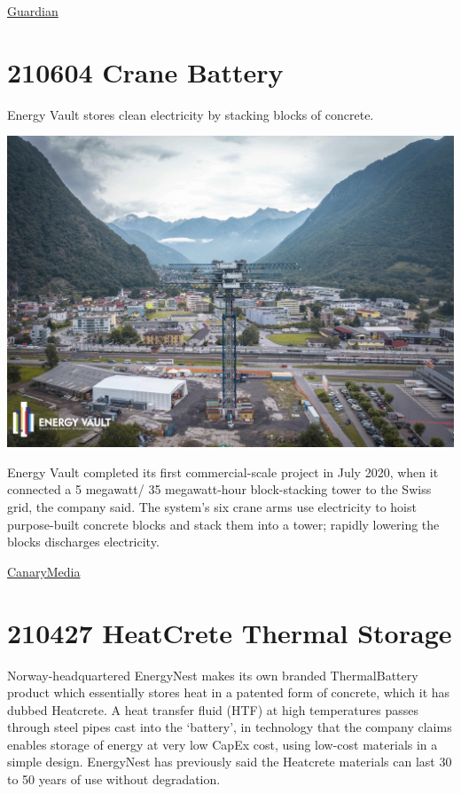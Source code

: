 \documentclass[
]{book}
\begin{document}
\href{https://www.theguardian.com/business/2021/jun/29/equinor-to-triple-uk-hydrogen-output-with-new-plant-near-hull}{Guardian}

\hypertarget{crane-battery}{%
\section{210604 Crane Battery}\label{crane-battery}}

Energy Vault stores clean electricity by stacking blocks of concrete.

\includegraphics{fig/crane_battery.png}

Energy Vault completed its first commercial-scale project in July 2020, when it connected a 5 megawatt/ 35 megawatt-hour block-stacking tower to the Swiss grid, the company said. The system's six crane arms use electricity to hoist purpose-built concrete blocks and stack them into a tower; rapidly lowering the blocks discharges electricity.

\href{https://www.canarymedia.com/articles/energy-vault-nabs-investment-from-saudi-aramco-for-block-stacking-storage/}{CanaryMedia}

\hypertarget{heatcrete-thermal-storage}{%
\section{210427 HeatCrete Thermal Storage}\label{heatcrete-thermal-storage}}

Norway-headquartered EnergyNest makes its own branded ThermalBattery product which essentially stores heat in a patented form of concrete, which it has dubbed Heatcrete. A heat transfer fluid (HTF) at high temperatures passes through steel pipes cast into the `battery', in technology that the company claims enables storage of energy at very low CapEx cost, using low-cost materials in a simple design. EnergyNest has previously said the Heatcrete materials can last 30 to 50 years of use without degradation.
\end{document}
